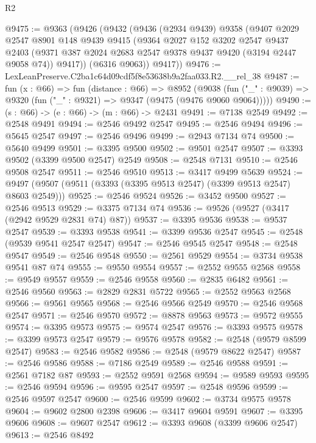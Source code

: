 \begin{lexlean}{R2}
\begin{coremodule}
@9475 := @9363
    (@9426
      (@9432
        (@9436
          (@2934 @9439)
          @9358
          (@9407
            @2029
            @2547
            @8901
            @148
            @9439
            @9415
            (@9364
              @2027
              @152
              @3202
              @2547
              @9437
              @2403
              (@9371 @387 @2024 @2683 @2547 @9378 @9437 @9420 (@3194 @2447 @9058 @74))
              @9417))
          (@6316 @9063))
        @9417))
@9476 := LexLeanPreserve.C2ba1c64d09cdf5f8e53638b9a2faa033.R2.__rel_38
@9487 := fun (x : @66) =>
  fun (distance : @66) =>
  @8952
    (@9038 (fun ("_" : @9039) => @9320 (fun ("_" : @9321) => @9347 (@9475 (@9476 @9060 @9064)))))
@9490 := (s : @66) -> (e : @66) -> (m : @66) -> @2431
@9491 := @7138 @2549
@9492 := @2548 @9491
@9494 := @2546 @9492 @2547
@9495 := @2546 @9494
@9496 := @5645 @2547
@9497 := @2546 @9496
@9499 := @2943 @7134 @74
@9500 := @5640 @9499
@9501 := @3395 @9500
@9502 := @9501 @2547
@9507 := @3393 @9502 (@3399 @9500 @2547) @2549
@9508 := @2548 @7131
@9510 := @2546 @9508 @2547
@9511 := @2546 @9510
@9513 := @3417 @9499 @5639
@9524 := @9497 (@9507 (@9511 (@3393 (@3395 @9513 @2547) (@3399 @9513 @2547) @8603 @2549)))
@9525 := @2546 @9524
@9526 := @3452 @9500
@9527 := @2546 @9513
@9529 := @3375 @7134 @74
@9536 := @9526 (@9527 (@3417 (@2942 @9529 @2831 @74) @87))
@9537 := @3395 @9536
@9538 := @9537 @2547
@9539 := @3393 @9538
@9541 := @3399 @9536 @2547
@9545 := @2548 (@9539 @9541 @2547 @2547)
@9547 := @2546 @9545 @2547
@9548 := @2548 @9547
@9549 := @2546 @9548
@9550 := @2561 @9529
@9554 := @3734 @9538 @9541 @87 @74
@9555 := @9550 @9554
@9557 := @2552 @9555 @2568
@9558 := @9549 @9557
@9559 := @2546 @9558
@9560 := @2835 @6482
@9561 := @2546 @9560
@9563 := @2829 @2831 @5722
@9565 := @2552 @9563 @2568
@9566 := @9561 @9565
@9568 := @2546 @9566 @2549
@9570 := @2546 @9568 @2547
@9571 := @2546 @9570
@9572 := @8878 @9563
@9573 := @9572 @9555
@9574 := @3395 @9573
@9575 := @9574 @2547
@9576 := @3393 @9575
@9578 := @3399 @9573 @2547
@9579 := @9576 @9578
@9582 := @2548 (@9579 @8599 @2547)
@9583 := @2546 @9582
@9586 := @2548 (@9579 @8622 @2547)
@9587 := @2546 @9586
@9588 := @7186 @2549
@9589 := @2546 @9588
@9591 := @2561 @7182 @87
@9593 := @2552 @9591 @2568
@9594 := @9589 @9593
@9595 := @2546 @9594
@9596 := @9595 @2547
@9597 := @2548 @9596
@9599 := @2546 @9597 @2547
@9600 := @2546 @9599
@9602 := @3734 @9575 @9578
@9604 := @9602 @2800 @2398
@9606 := @3417 @9604 @9591
@9607 := @3395 @9606
@9608 := @9607 @2547
@9612 := @3393 @9608 (@3399 @9606 @2547)
@9613 := @2546 @8492

\end{coremodule}
\end{lexlean}
